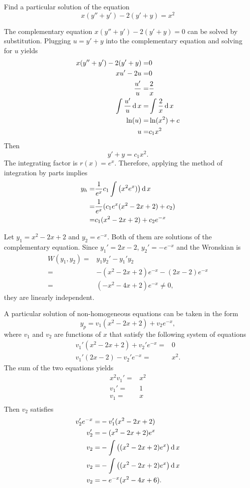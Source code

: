 \begin{example}
    Find a particular solution of the equation
    \[x(y''+ y')- 2(y'+y)=x^2\]
\end{example}
\begin{solution}
  The complementary equation $x(y''+ y')- 2(y'+y)=0$ can be solved by substitution.
  Plugging $u=y'+y$ into the complementary equation and solving for $u$ yields
  \[
  \begin{aligned}
    x(y''+ y')- 2(y'+y)=&0\\
    x u'- 2u=&0\\
    \frac{u'}{u}=&\frac2x\\
    \int\frac{u'}{u}\operatorname{d} x=&\int\frac2x\operatorname{d} x\\
    \ln(u)=&\ln(x^2)+c\\
    u=&c_1x^2\\
  \end{aligned}  
  \]
  Then \[y'+y=c_1x^2.\]
  The integrating factor is $r(x)=e^x$.
  Therefore, applying the method of integration by parts implies
  \[
    \begin{aligned}
      y_h=&\frac{1}{e^x}c_1\int\left(x^2e^x)\right)\operatorname{d} x\\
      =&\frac{1}{e^x}(c_1e^x(x^2-2x+2)+c_2)\\
      =&c_1(x^2-2x+2)+c_2e^{-x}
    \end{aligned}
  \]

  Let $y_1=x^2-2x+2$ and $y_2=e^{-x}$. Both of them are solutions of the complementary equation. Since $y_1'=2x-2$, $y_2'=-e^{-x}$ and the Wronskian is 
  \[
  \begin{aligned}
    W(y_1, y_2)=&y_1y_2'-y_1'y_2\\
    =&-(x^2-2x+2)e^{-x}-(2x-2)e^{-x}\\
    =&(-x^2-4x+2)e^{-x}\ne 0,
  \end{aligned}  
  \]
  they are linearly independent.

  A particular solution of non-homogeneous equations can be taken in the form
  \[y_p=v_1(x^2-2x+2)+v_2e^{-x},\]
  where $v_1$ and $v_2$ are functions of $x$ that satisfy the following system of equations
  \[
    \begin{aligned} 
      v_1'(x^2-2x+2)+v_2'e^{-x}=&0\\ 
      v_1'(2x-2)-v_2'e^{-x}=&x^2.
    \end{aligned}
  \]
  The sum of the two equations yields
  \[
  \begin{aligned}
    x^2v_1'=&x^2\\
    v_1'=&1\\
    v_1=&x\\
  \end{aligned}  
  \]
  Then $v_2$ satisfies
  \[
    \begin{aligned}
      v_2'e^{-x}=&-v_1'(x^2-2x+2)\\
      v_2'=&-(x^2-2x+2)e^{x}\\
      v_2=&-\int\left((x^2-2x+2)e^{x}\right)\operatorname{d} x\\
      v_2=&-\int\left((x^2-2x+2)e^{x}\right)\operatorname{d} x\\
      v_2=&-e^{-x}(x^2-4x+6).
    \end{aligned}
  \]


\end{solution}
